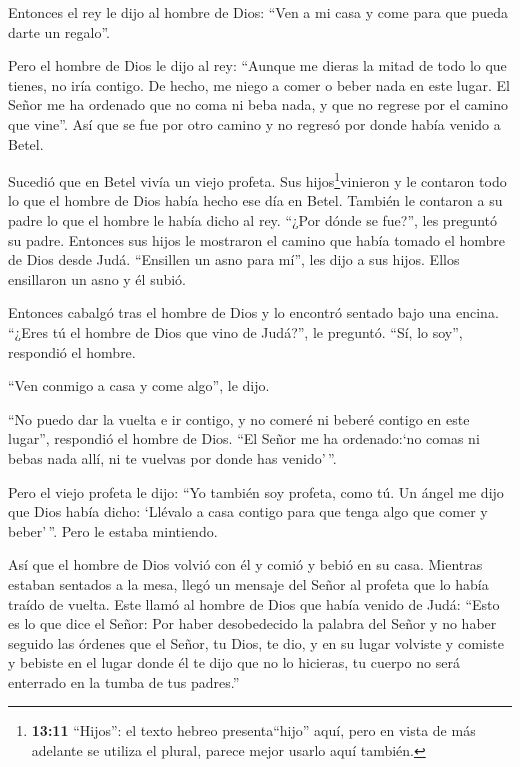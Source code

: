  Entonces el rey le dijo al hombre de Dios: ``Ven a mi casa
y come para que pueda darte un regalo''.

 Pero el hombre de Dios le dijo al rey: ``Aunque me dieras
la mitad de todo lo que tienes, no iría contigo. De hecho, me niego a
comer o beber nada en este lugar.  El Señor me ha ordenado
que no coma ni beba nada, y que no regrese por el camino que vine''.
 Así que se fue por otro camino y no regresó por donde
había venido a Betel.

 Sucedió que en Betel vivía un viejo profeta. Sus
hijos\footnote{\textbf{13:11} ``Hijos'': el texto hebreo
  presenta``hijo'' aquí, pero en vista de más adelante se utiliza el
  plural, parece mejor usarlo aquí también.}vinieron y le contaron todo
lo que el hombre de Dios había hecho ese día en Betel. También le
contaron a su padre lo que el hombre le había dicho al rey.
 ``¿Por dónde se fue?'', les preguntó su padre. Entonces
sus hijos le mostraron el camino que había tomado el hombre de Dios
desde Judá.  ``Ensillen un asno para mí'', les dijo a sus
hijos. Ellos ensillaron un asno y él subió.

 Entonces cabalgó tras el hombre de Dios y lo encontró
sentado bajo una encina. ``¿Eres tú el hombre de Dios que vino de
Judá?'', le preguntó. ``Sí, lo soy'', respondió el hombre.

 ``Ven conmigo a casa y come algo'', le dijo.

 ``No puedo dar la vuelta e ir contigo, y no comeré ni
beberé contigo en este lugar'', respondió el hombre de Dios.
 ``El Señor me ha ordenado:`no comas ni bebas nada allí, ni
te vuelvas por donde has venido'\,''.

 Pero el viejo profeta le dijo: ``Yo también soy profeta,
como tú. Un ángel me dijo que Dios había dicho: `Llévalo a casa contigo
para que tenga algo que comer y beber'\,''. Pero le estaba mintiendo.

 Así que el hombre de Dios volvió con él y comió y bebió en
su casa.  Mientras estaban sentados a la mesa, llegó un
mensaje del Señor al profeta que lo había traído de vuelta.
 Este llamó al hombre de Dios que había venido de Judá:
``Esto es lo que dice el Señor: Por haber desobedecido la palabra del
Señor y no haber seguido las órdenes que el Señor, tu Dios, te dio,
 y en su lugar volviste y comiste y bebiste en el lugar
donde él te dijo que no lo hicieras, tu cuerpo no será enterrado en la
tumba de tus padres.''

